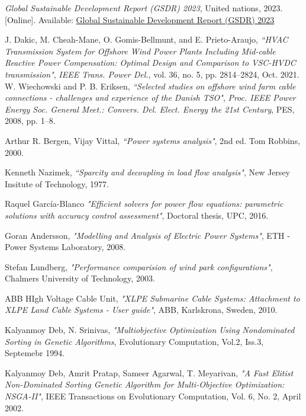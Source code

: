 \documentclass[a4paper,11pt, titlepage, twoside]{article}
\begin{document}
 \begin{thebibliography}{99}\label{biblio}
 

 \textit{Global Sustainable Development Report (GSDR) 2023}, United nations, 2023. [Online]. 
 Available: \href{https://sdgs.un.org/gsdr/gsdr2023}{Global Sustainable Development Report (GSDR) 2023}
 
 {J. Dakic, M. Cheah-Mane, O. Gomis-Bellmunt, and E. Prieto-Araujo},
\textit{“HVAC Transmission System for Offshore Wind Power Plants Including
 Mid-cable Reactive Power Compensation: Optimal Design and Comparison to VSC-HVDC transmission"}, \textit{IEEE Trans. Power Del.}, vol. 36,
 no. 5, pp. 2814–2824, Oct. 2021.
 {W. Wiechowski and P. B. Eriksen},
\textit{“Selected studies on offshore wind farm
cable connections - challenges and experience of the Danish TSO"}, \textit{Proc.
IEEE Power Energy Soc. General Meet.: Convers. Del. Elect. Energy the
21st Century}, PES, 2008, pp. 1–8.

 {Arthur R. Bergen, Vijay Vittal},
\textit{“Power systems analysis"}, 2nd ed. Tom Robbins, 2000.

{Kenneth Nazimek},
\textit{“Sparcity and decoupling in load flow analysis"}, New Jersey Insitute of Technology, 1977.

{ Raquel García-Blanco}
\textit{"Efficient solvers for power flow equations: parametric solutions with accuracy control assessment"}, Doctoral thesis, UPC, 2016.


{Goran Andersson},
\textit{"Modelling and Analysis of Electric Power Systems"}, ETH - Power Systems Laboratory, 2008.

{Stefan Lundberg},
\textit{"Performance comparision of wind park configurations"}, Chalmers University of Technology, 2003.

{ABB HIgh Voltage Cable Unit},
\textit{"XLPE Submarine Cable Systems: Attachment to XLPE Land Cable Systems - User guide"}, ABB, Karlskrona, Sweden, 2010.

{Kalyanmoy Deb, N. Srinivas},
\textit{"Multiobjective Optimization Using Nondominated Sorting in Genetic Algorithms}, Evolutionary Computation, Vol.2, Iss.3, Septemebr 1994.

{Kalyanmoy Deb, Amrit Pratap, Sameer Agarwal, T. Meyarivan},
\textit{"A Fast Elitist Non-Dominated Sorting Genetic Algorithm for Multi-Objective Optimization: NSGA-II"}, IEEE Transactions on Evolutionary Computation, Vol. 6, No. 2, April 2002.


\end{thebibliography}
\end{document}
